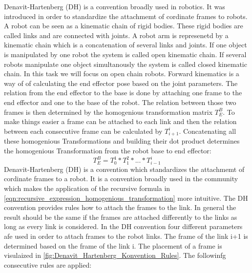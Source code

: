 \documentclass{tpk4170report}
\begin{document}
Denavit-Hartenberg (DH) is a convention broadly used in robotics. It was introduced in order to standardize the attachmemt of cordinate frames to robots. A robot can be seen as a kinematic chain of rigid bodies. These rigid bodies are called links and are connected with joints. A robot arm is represenetd by a kinematic chain which is a concatenation of several links and joints. If one object is manipulated by one robot the system is called open kinematic chain. If several robots manipulate one object simultanously the system is called closed kinematic chain. In this task we will focus on open chain robots. Forward kinematics is a way of of calculating the end effector pose based on the joint parameters. The relation from the end effector to the base is done by attaching one frame to the end effector and one to the base of the robot. The relation between those two frames is then determined by the homogenious transformation matrix \(T_{E}^{B}\). To make things easier a frame can be attached to each link and then the relation between each consecutive frame can be calculated by \(T_{i+1}^{i}\). Concatenating all these homogenious Transformations and building their dot product determines the homogenious Transformation from the robot base to end effector: 
\begin{equation}
  T_{E}^{B} = T_{0}^{1}*T_{1}^{2}* ... *T_{i-1}^{i}
  \label{eqn:recursive_expression_homogenious_transformation}
\end{equation}
Denavit-Hartenberg (DH) is a convention which standardizes the attachmemt of cordinate frames to a robot. It is a convention broadly used in the community which makes the application of the recursive formula in \ref{eqn:recursive_expression_homogenious_transformation} more intuitive. The DH convention provides rules how to attach the frames to the link. In general the result should be the same if the frames are attached differently to the links as long as every link is considered. In the DH convention four different parameters afe used in order to attach frames to the robot links. The frame of the link i+1 is determined based on the frame of the link i. The placement of a frame is visulaized in \ref{fig:Denavit_Hartenberg_Konvention_Rules}. The followinfg consecutive rules are applied:
\end{document}

